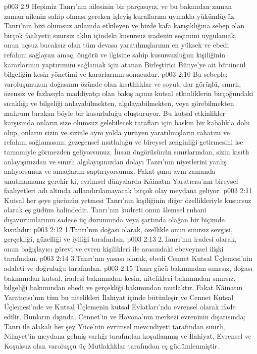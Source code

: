 \vs p003 2:9 Hepimiz Tanrı’nın ailesinin bir parçasıyız, ve bu bakımdan zaman zaman ailenin sahip olması gereken işleyiş kurallarına uymakla yükümlüyüz. Tanrı’nın bizi olumsuz anlamda etkileyen ve bizde kafa karışıklığına sebep olan birçok faaliyeti; sınırsız aklın içindeki kusursuz iradenin seçimini uygulamak, onun uçsuz bucaksız olan tüm devasa yaratılmışlarının en yüksek ve ebedi refahını sağlayan amaç, öngörü ve ilgisine sahip kusursuzluğun kişiliğinin kararlarının yaptırımını sağlamak için atanan Birleştirici Bünye’ye ait bütüncül bilgeliğin kesin yönetimi ve kararlarının sonucudur.
\vs p003 2:10 Bu sebeple; varoluşunuzun doğasının özünde olan kısıtlılıklar ve soyut, dar görüşlü, sınırlı, özensiz ve fazlasıyla maddiyatçı olan bakış açınız kutsal etkinliklerin birçoğundaki sıcaklığı ve bilgeliği anlayabilmekten, algılayabilmekten, veya görebilmekten mahrum bırakan böyle bir kusurluluğu oluşturuyor. Bu kutsal etkinlikler karşısında onların size olumsuz gelebilecek tarafları için baskın bir kabalıkla dolu olup, onların sizin ve sizinle aynı yolda yürüyen yaratılmışların rahatını ve refahını sağlamasını, gezegensel mutluluğu ve bireysel zenginliği getirmesini ise tamamiyle görmezden geliyorsunuz. İnsan öngörüsünün sınırlarından, sizin kısıtlı anlayışınızdan ve sınırlı algılayışınızdan dolayı Tanrı’nın niyetlerini yanlış anlıyorsunuz ve amaçlarını saptırıyorsunuz. Fakat şunu aynı zamanda unutmamanız gerekir ki, evrimsel dünyalarda Kâinatın Yaratıcısı’nın bireysel faaliyetleri adı altında adlandırılamayacak birçok olay meydana geliyor.
\vs p003 2:11 Kutsal her şeye gücünün yetmesi Tanrı’nın kişiliğinin diğer özellikleriyle kusursuz olarak eş güdüm halindedir. Tanrı’nın kudreti onun âlemsel ruhani dışavurumlarının sadece üç durumunda veya şartında olağan bir biçimde kısıtlıdır:
\vs p003 2:12 1.\bibnobreakspace Tanrı’nın doğası olarak, özellikle onun sınırsız sevgisi, gerçekliği, güzelliği ve iyiliği tarafından.
\vs p003 2:13 2.\bibnobreakspace Tanrı’nın iradesi olarak, onun bağışlayıcı görevi ve evren kişilikleri ile arasındaki ebeveynsel ilişki tarafından.
\vs p003 2:14 3.\bibnobreakspace Tanrı’nın yasası olarak, ebedi Cennet Kutsal Üçlemesi’nin adaleti ve doğruluğu tarafından.
\vs p003 2:15 Tanrı gücü bakımından sınırsız, doğası bakımından kutsal, iradesi bakımından kesin, nitelikleri bakımından sınırsız, bilgeliği bakımından ebedi ve gerçekliği bakımından mutlaktır. Fakat Kâinatın Yaratıcısı’nın tüm bu nitelikleri İlahiyat içinde bütünleşir ve Cennet Kutsal Üçlemesi’nde ve Kutsal Üçlemenin kutsal Evlatları’nda evrensel olarak ifade edilir. Bunların dışında, Cennet’in ve Havona’nın merkezi evreninin dışarısında; Tanrı ile alakalı her şey Yüce’nin evrimsel mevcudiyeti tarafından sınırlı, Nihayet’in meydana gelmiş varlığı tarafından koşullanmış ve İlahiyat, Evrensel ve Koşulsuz olan varoluşçu üç Mutlaklıklar tarafından eş güdümlenmiştir.
